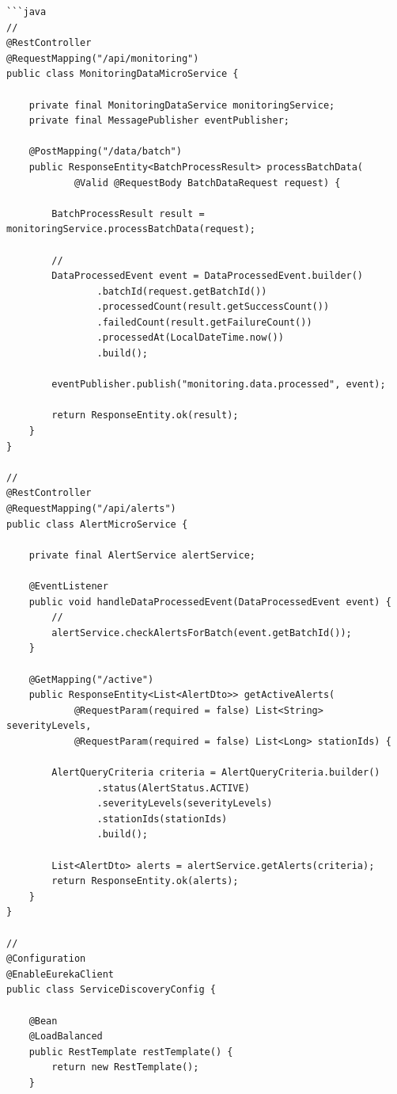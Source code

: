 \begin{verbatim}
```java
// 
@RestController
@RequestMapping("/api/monitoring")
public class MonitoringDataMicroService {
    
    private final MonitoringDataService monitoringService;
    private final MessagePublisher eventPublisher;
    
    @PostMapping("/data/batch")
    public ResponseEntity<BatchProcessResult> processBatchData(
            @Valid @RequestBody BatchDataRequest request) {
        
        BatchProcessResult result = monitoringService.processBatchData(request);
        
        // 
        DataProcessedEvent event = DataProcessedEvent.builder()
                .batchId(request.getBatchId())
                .processedCount(result.getSuccessCount())
                .failedCount(result.getFailureCount())
                .processedAt(LocalDateTime.now())
                .build();
                
        eventPublisher.publish("monitoring.data.processed", event);
        
        return ResponseEntity.ok(result);
    }
}

//   
@RestController
@RequestMapping("/api/alerts")
public class AlertMicroService {
    
    private final AlertService alertService;
    
    @EventListener
    public void handleDataProcessedEvent(DataProcessedEvent event) {
        // 
        alertService.checkAlertsForBatch(event.getBatchId());
    }
    
    @GetMapping("/active")
    public ResponseEntity<List<AlertDto>> getActiveAlerts(
            @RequestParam(required = false) List<String> severityLevels,
            @RequestParam(required = false) List<Long> stationIds) {
        
        AlertQueryCriteria criteria = AlertQueryCriteria.builder()
                .status(AlertStatus.ACTIVE)
                .severityLevels(severityLevels)
                .stationIds(stationIds)
                .build();
                
        List<AlertDto> alerts = alertService.getAlerts(criteria);
        return ResponseEntity.ok(alerts);
    }
}

// 
@Configuration
@EnableEurekaClient
public class ServiceDiscoveryConfig {
    
    @Bean
    @LoadBalanced
    public RestTemplate restTemplate() {
        return new RestTemplate();
    }
    

\end{verbatim}
